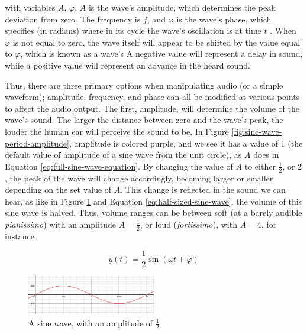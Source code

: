with variables $A$, $\varphi$. $A$ is the wave's amplitude, which determines the peak deviation from zero. The frequency is $f$, and $\varphi$ is the wave's phase, which specifies (in radians) where in its cycle the wave's oscillation is at time $t$ \cite{Kirk_Hunt_2013}. When $\varphi$ is not equal to zero, the wave itself will appear to be shifted by the value equal to $\varphi$, which is known as a wave's  A negative value will represent a delay in sound, while a positive value will represent an advance in the heard sound.

Thus, there are three primary options when manipulating audio (or a simple waveform); amplitude, frequency, and phase can all be modified at various points to affect the audio output. The first, amplitude, will determine the volume of the wave's sound. The larger the distance between zero and the wave's peak, the louder the human ear will perceive the sound to be\cite{Zjalic_2021}. In Figure \ref{fig:sine-wave-period-amplitude}, amplitude is colored purple, and we see it has a value of 1 (the default value of amplitude of a sine wave from the unit circle), as $A$ does in Equation \ref{eq:full-sine-wave-equation}. By changing the value of $A$ to either $\frac{1}{2}$, or $2$, the peak of the wave will change accordingly, becoming larger or smaller depending on the set value of $A$. This change is reflected in the sound we can hear, as like in Figure \ref{fig:half-sized-sine-wave} and Equation \ref{eq:half-sized-sine-wave}, the volume of this sine wave is halved. Thus, volume ranges can be between soft (at a barely audible \textit{pianissimo}) with an amplitude $A = \frac{1}{2}$, or loud (\textit{fortissimo}), with $A = 4$, for instance.

\begin{equation}\label{eq:half-sized-sine-wave}
	y(t) = \frac{1}{2} \sin(\omega t + \varphi)
\end{equation}

\begin{figure}[ht]
	\centering
	\includegraphics[width=0.5\textwidth]{figures/half-sized-sine-wave.png}
	\caption{A sine wave, with an amplitude of $\frac{1}{2}$}
	\label{fig:half-sized-sine-wave}
\end{figure}

